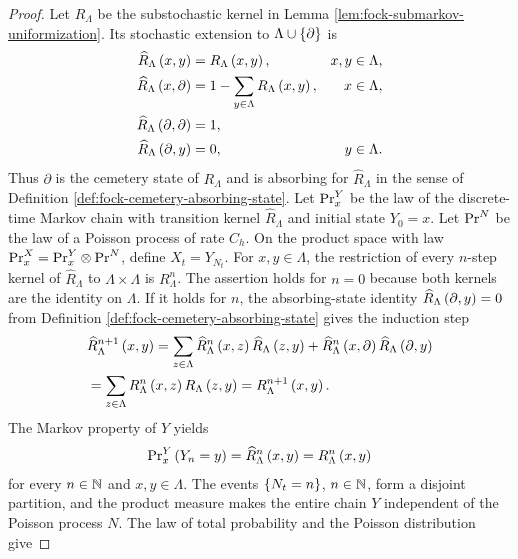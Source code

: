 \documentclass[11pt,a4paper]{article}
\theoremstyle{plain}
\theoremstyle{definition}
\theoremstyle{remark}
\begin{document}
\begin{proof}
Let $R_{\Lambda}$ be the substochastic kernel in
Lemma \ref{lem:fock-submarkov-uniformization}.
Its stochastic extension to $\Lambda\cup\left\{ \partial \right\}$ is
$$\begin{aligned}
\widehat{R}_{\Lambda} \left( x,y \right)
& =
R_{\Lambda} \left( x,y \right),
&
x,y
& \in
\Lambda,
\\
\widehat{R}_{\Lambda} \left( x,\partial \right)
& =
1-
\sum_{y\in\Lambda}R_{\Lambda} \left( x,y \right),
&
x
& \in
\Lambda,
\\
\widehat{R}_{\Lambda} \left( \partial,\partial \right)
& =
1,
\\
\widehat{R}_{\Lambda} \left( \partial,y \right)
& =
0,
&
y
& \in
\Lambda.
\end{aligned}$$
Thus $\partial$ is the cemetery state of $R_{\Lambda}$ and is absorbing for
$\widehat{R}_{\Lambda}$ in the sense of Definition \ref{def:fock-cemetery-absorbing-state}.
Let $\mathrm{Pr}_x^{Y}$ be the law of the discrete-time Markov chain with transition kernel
$\widehat{R}_{\Lambda}$ and initial state $Y_0=x$.
Let $\mathrm{Pr}^{N}$ be the law of a Poisson process of rate $C_h$.
On the product space with law $\mathrm{Pr}_x^{X}=\mathrm{Pr}_x^{Y}\otimes\mathrm{Pr}^{N}$, define
$X_t=Y_{N_t}$.
For $x,y\in\Lambda$, the restriction of every $n$-step kernel of $\widehat{R}_{\Lambda}$ to
$\Lambda\times\Lambda$ is $R_{\Lambda}^{n}$.
The assertion holds for $n=0$ because both kernels are the identity on $\Lambda$.
If it holds for $n$, the absorbing-state identity
$\widehat{R}_{\Lambda} \left( \partial,y \right)=0$ from
Definition \ref{def:fock-cemetery-absorbing-state} gives the induction step
$$\begin{aligned}
&
\fun{\widehat{R}_{\Lambda}^{n+1}}{x,y}
=
\sum_{z\in\Lambda}
\fun{\widehat{R}_{\Lambda}^{n}}{x,z}
\fun{\widehat{R}_{\Lambda}}{z,y}
+
\fun{\widehat{R}_{\Lambda}^{n}}{x,\partial}
\fun{\widehat{R}_{\Lambda}}{\partial,y}
\\ %
&=
\sum_{z\in\Lambda}
\fun{R_{\Lambda}^{n}}{x,z}
\fun{R_{\Lambda}}{z,y}
=
\fun{R_{\Lambda}^{n+1}}{x,y}.
\end{aligned}$$
The Markov property of $Y$ yields
$$\begin{aligned}
\mathrm{Pr}_x^{Y} \left( Y_n=y \right)
=
\widehat{R}_{\Lambda}^{n} \left( x,y \right)
=
R_{\Lambda}^{n} \left( x,y \right)
\end{aligned}$$
for every $n\in\mathbb{N}$ and $x,y\in\Lambda$.
The events $\left\{ N_t=n \right\}$, $n\in\mathbb{N}$, form a disjoint partition, and the product measure makes the
entire chain $Y$ independent of the Poisson process $N$.
The law of total probability and the Poisson distribution give

\end{proof}
\end{document}
